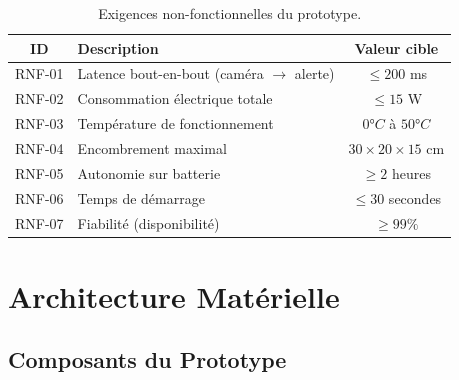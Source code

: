 \documentclass[12pt,a4paper,twoside]{report}
\begin{document}
\begin{table}[H]
\centering
\caption{Exigences non-fonctionnelles du prototype.}
\label{tab:req_non_fonctionnelles}
\renewcommand{\arraystretch}{1.4}
\begin{tabularx}{\textwidth}{|c|X|c|}
\hline
\rowcolor{stellantisblue!15}
\textbf{ID} & \textbf{Description} & \textbf{Valeur cible} \\
\hline
RNF-01 & Latence bout-en-bout (caméra $\rightarrow$ alerte) & $\leq 200$ ms \\
\hline
RNF-02 & Consommation électrique totale & $\leq 15$ W \\
\hline
RNF-03 & Température de fonctionnement & $0°C$ à $50°C$ \\
\hline
RNF-04 & Encombrement maximal & $30 \times 20 \times 15$ cm \\
\hline
RNF-05 & Autonomie sur batterie & $\geq 2$ heures \\
\hline
RNF-06 & Temps de démarrage & $\leq 30$ secondes \\
\hline
RNF-07 & Fiabilité (disponibilité) & $\geq 99\%$ \\
\hline
\end{tabularx}
\end{table}

\section{Architecture Matérielle}

\subsection{Composants du Prototype}
\end{document}
